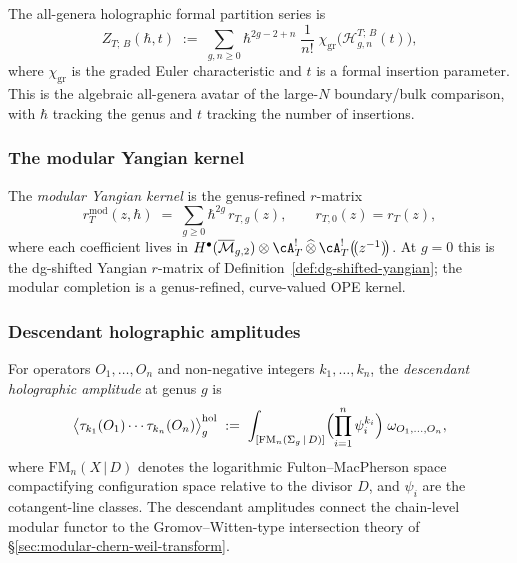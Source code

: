 \begin{definition}
\label{def:holographic-partition-function}
The all-genera holographic formal partition series is
\begin{equation}\label{eq:holographic-pf}
 Z_{T;\,B}(\hbar, t)
 \;:=\;
 \sum_{g,n \ge 0}
 \hbar^{2g-2+n}\;
 \frac{1}{n!}\;
 \chi_{\mathrm{gr}}\bigl(
 \mathcal{H}_{g,n}^{T;\,B}(t)\bigr),
\end{equation}
where $\chi_{\mathrm{gr}}$ is the graded Euler characteristic and
$t$ is a formal insertion parameter. This is the algebraic
all-genera avatar of the large-$N$ boundary/bulk comparison, with
$\hbar$ tracking the genus and $t$ tracking the number of insertions.
\end{definition}

\subsubsection{The modular Yangian kernel}

\begin{definition}
\label{def:modular-r-matrix-genus}
The \emph{modular Yangian kernel} is the genus-refined $r$-matrix
\begin{equation}\label{eq:modular-r-genus}
 r_T^{\mathrm{mod}}(z, \hbar)
 \;=\;
 \sum_{g \ge 0} \hbar^{2g}\, r_{T,g}(z),
 \qquad
 r_{T,0}(z) = r_T(z),
\end{equation}
where each coefficient lives in
$H^\bullet(\overline{\mathcal{M}}_{g,2}) \otimes
\cA_T^! \,\widehat{\otimes}\, \cA_T^!\bigl(\!(z^{-1})\!\bigr)$.
At $g = 0$ this is the dg-shifted Yangian $r$-matrix of
Definition~\ref{def:dg-shifted-yangian}; the modular completion is a
genus-refined, curve-valued OPE kernel.
\end{definition}

\subsubsection{Descendant holographic amplitudes}

\begin{definition}
\label{def:descendant-hol-amplitudes}
For operators $O_1, \dotsc, O_n$ and non-negative integers
$k_1, \dotsc, k_n$, the \emph{descendant holographic amplitude} at
genus $g$ is
\begin{equation}\label{eq:descendant-amplitude}
 \bigl\langle
 \tau_{k_1}(O_1) \dotsm \tau_{k_n}(O_n)
 \bigr\rangle_g^{\mathrm{hol}}
 \;:=\;
 \int_{[\mathrm{FM}_n(\Sigma_g \,|\, D)]}
 \Bigl(\prod_{i=1}^n \psi_i^{k_i}\Bigr)\;
 \omega_{O_1, \dotsc, O_n},
\end{equation}
where $\mathrm{FM}_n(X \,|\, D)$ denotes the logarithmic
Fulton--MacPherson space compactifying configuration space relative to
the divisor $D$, and $\psi_i$ are the cotangent-line classes. The
descendant amplitudes connect the chain-level modular functor to the
Gromov--Witten-type intersection theory of
\S\ref{sec:modular-chern-weil-transform}.
\end{definition}

